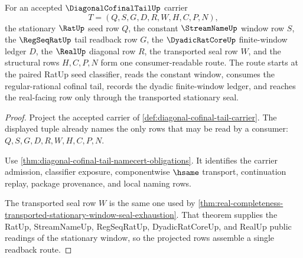 \begin{theorem}
\label{thm:diagonal-cofinal-tail-seed-window-readback}
For an accepted $\DiagonalCofinalTailUp$ carrier
$$
T=(Q,S,G,D,R,W,H,C,P,N),
$$
the stationary $\RatUp$ seed row $Q$, the constant $\StreamNameUp$ window row $S$, the $\RegSeqRatUp$ tail readback row $G$, the $\DyadicRatCoreUp$ finite-window ledger $D$, the $\RealUp$ diagonal row $R$, the transported seal row $W$, and the structural rows $H,C,P,N$ form one consumer-readable route. The route starts at the paired RatUp seed classifier, reads the constant window, consumes the regular-rational cofinal tail, records the dyadic finite-window ledger, and reaches the real-facing row only through the transported stationary seal.
\end{theorem}
\begin{proof}
Project the accepted carrier of \autoref{def:diagonal-cofinal-tail-carrier}. The displayed tuple already names the only rows that may be read by a consumer: $Q,S,G,D,R,W,H,C,P,N$.

Use \autoref{thm:diagonal-cofinal-tail-namecert-obligations}. It identifies the carrier admission, classifier exposure, componentwise $\hsame$ transport, continuation replay, package provenance, and local naming rows.

The transported seal row $W$ is the same one used by \autoref{thm:real-completeness-transported-stationary-window-seal-exhaustion}. That theorem supplies the RatUp, StreamNameUp, RegSeqRatUp, DyadicRatCoreUp, and RealUp public readings of the stationary window, so the projected rows assemble a single readback route.
\end{proof}

